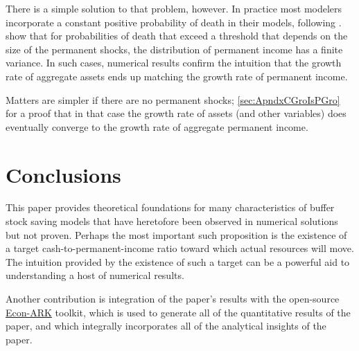 \documentclass[BufferStockTheory]{subfiles}
\begin{document}
{  There is a simple solution to that problem, however. In practice most modelers incorporate a constant positive probability of death in their models, following \cite{blanchardFinite}.  \cite{cstwMPC} show that for probabilities of death that exceed a threshold that depends on the size of the permanent shocks, the distribution of permanent income has a finite variance.  In such cases, numerical results confirm the intuition that the growth rate of aggregate assets ends up matching the growth rate of permanent income.

  Matters are simpler if there are no permanent shocks; \ref{sec:ApndxCGroIsPGro} for a proof that in that case the growth rate of assets (and other variables) does eventually converge to the growth rate of aggregate permanent income.

} %

\hypertarget{Conclusions}{}
\section{Conclusions}

This paper provides theoretical foundations for many characteristics
of buffer stock saving models that have heretofore been observed in
numerical solutions but not proven.  Perhaps the most important such
proposition is the existence of a target cash-to-permanent-income
ratio toward which actual resources will move.  The intuition provided by
the existence of such a target can be a powerful aid to understanding a host
of numerical results.

Another contribution is integration of the paper's results with the open-source \href{https://econ-ark.org}{Econ-ARK} toolkit, which is used to generate all of the quantitative results of the paper, and which integrally incorporates all of the analytical insights of the paper.

\clearpage\vfill\eject

\onlyinsubfile{}

\end{document}
